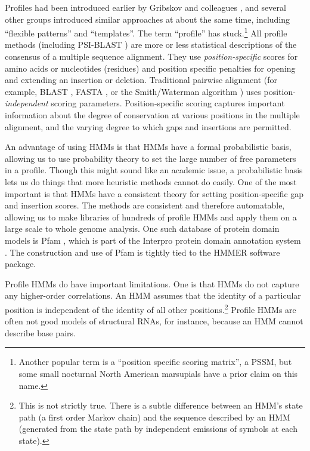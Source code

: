 Profiles had been introduced earlier by Gribskov and colleagues
\citep{Gribskov87,Gribskov90}, and several other groups introduced
similar approaches at about the same time, including ``flexible
patterns'' \citep{Barton90} and
``templates''\citep{Bashford87,Taylor86}. The term ``profile'' has
stuck.\footnote{Another popular term is a ``position specific scoring
  matrix'', a PSSM, but some small nocturnal North American marsupials
  have a prior claim on this name.}  All profile methods (including
PSI-BLAST \citep{Altschul97}) are more or less statistical
descriptions of the consensus of a multiple sequence alignment. They
use \emph{position-specific} scores for amino acids or nucleotides
(residues) and position specific penalties for opening and extending
an insertion or deletion.  Traditional pairwise alignment (for
example, BLAST \citep{Altschul90}, FASTA \citep{Pearson88}, or the
Smith/Waterman algorithm \citep{Smith81}) uses position-{\em
  independent} scoring parameters. Position-specific scoring captures
important information about the degree of conservation at various
positions in the multiple alignment, and the varying degree to which
gaps and insertions are permitted.

An advantage of using HMMs is that HMMs have a formal probabilistic
basis, allowing us to use probability theory to set the large number
of free parameters in a profile. Though this might sound like an
academic issue, a probabilistic basis lets us do things that more
heuristic methods cannot do easily. One of the most important is that
HMMs have a consistent theory for setting position-specific gap and
insertion scores. The methods are consistent and therefore
automatable, allowing us to make libraries of hundreds of profile HMMs
and apply them on a large scale to whole genome analysis.  One such
database of protein domain models is Pfam
\citep{Sonnhammer97,FinnBateman16}, which is part of the Interpro
protein domain annotation system \citep{MitchellFinn15}. The
construction and use of Pfam is tightly tied to the HMMER software
package.

Profile HMMs do have important limitations. One is that HMMs do not
capture any higher-order correlations.  An HMM assumes that the
identity of a particular position is independent of the identity of
all other positions.\footnote{This is not strictly true. There is a
  subtle difference between an HMM's state path (a first order Markov
  chain) and the sequence described by an HMM (generated from the
  state path by independent emissions of symbols at each state).}
Profile HMMs are often not good models of structural RNAs, for
instance, because an HMM cannot describe base pairs.



